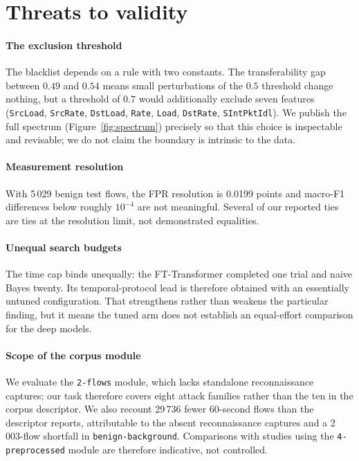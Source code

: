 \documentclass[review,12pt]{elsarticle}
\begin{document}
\section{Threats to validity}
\label{sec:threats}

\paragraph{The exclusion threshold}
The blacklist depends on a rule with two constants. The transferability gap between
$0.49$ and $0.54$ means small perturbations of the $0.5$ threshold change nothing, but a
threshold of $0.7$ would additionally exclude seven features
(\texttt{SrcLoad}, \texttt{SrcRate}, \texttt{DstLoad}, \texttt{Rate}, \texttt{Load},
\texttt{DstRate}, \texttt{SIntPktIdl}). We publish the full spectrum
(Figure~\ref{fig:spectrum}) precisely so that this choice is inspectable and revisable;
we do not claim the boundary is intrinsic to the data.

\paragraph{Measurement resolution}
With 5\,029 benign test flows, the FPR resolution is 0.0199 points and macro-F1
differences below roughly $10^{-4}$ are not meaningful. Several of our reported ties are
ties at the resolution limit, not demonstrated equalities.

\paragraph{Unequal search budgets}
The time cap binds unequally: the FT-Transformer completed one trial and naive Bayes
twenty. Its temporal-protocol lead is therefore obtained with an essentially untuned
configuration. That strengthens rather than weakens the particular finding, but it means
the tuned arm does not establish an equal-effort comparison for the deep models.

\paragraph{Scope of the corpus module}
We evaluate the \texttt{2-flows} module, which lacks standalone reconnaissance captures;
our task therefore covers eight attack families rather than the ten in the corpus
descriptor. We also recount 29\,736 fewer 60-second flows than the descriptor reports,
attributable to the absent reconnaissance captures and a 2\,003-flow shortfall in
\texttt{benign-background}. Comparisons with studies using the \texttt{4-preprocessed}
module are therefore indicative, not controlled.
\end{document}
